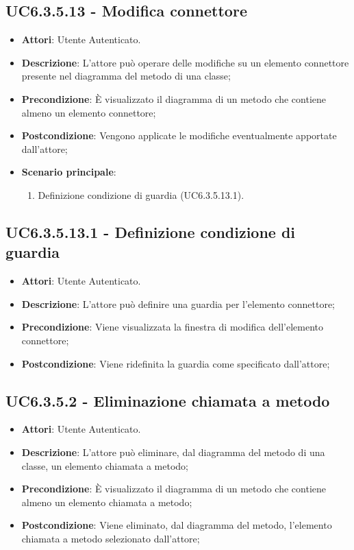 \subsection{UC6.3.5.13 - Modifica connettore} 
\label{ssec:UC6.3.5.13} 
\begin{itemize} 
\item \textbf{Attori}: Utente Autenticato.
\item \textbf{Descrizione}: L'attore può operare delle modifiche su un elemento connettore presente nel diagramma del metodo di una classe;
\item \textbf{Precondizione}: È visualizzato il diagramma di un metodo che contiene almeno un elemento connettore;
\item \textbf{Postcondizione}: Vengono applicate le modifiche eventualmente apportate dall'attore;
\item \textbf{Scenario principale}: \begin{enumerate}\item Definizione condizione di guardia (UC6.3.5.13.1). 
 \end{enumerate}
\end{itemize} 
\subsection{UC6.3.5.13.1 - Definizione condizione di guardia} 
\label{ssec:UC6.3.5.13.1} 
\begin{itemize} 
\item \textbf{Attori}: Utente Autenticato.
\item \textbf{Descrizione}: L'attore può definire una guardia per l'elemento connettore;
\item \textbf{Precondizione}: Viene visualizzata la finestra di modifica dell'elemento connettore;
\item \textbf{Postcondizione}: Viene ridefinita la guardia come specificato dall'attore;
\end{itemize} 
\subsection{UC6.3.5.2 - Eliminazione chiamata a metodo} 
\label{ssec:UC6.3.5.2} 
\begin{itemize} 
\item \textbf{Attori}: Utente Autenticato.
\item \textbf{Descrizione}: L'attore può eliminare, dal diagramma del metodo di una classe, un elemento chiamata a metodo;
\item \textbf{Precondizione}: È visualizzato il diagramma di un metodo che contiene almeno un elemento chiamata a metodo;
\item \textbf{Postcondizione}: Viene eliminato, dal diagramma del metodo,  l'elemento chiamata a metodo selezionato dall'attore;
\end{itemize} 
